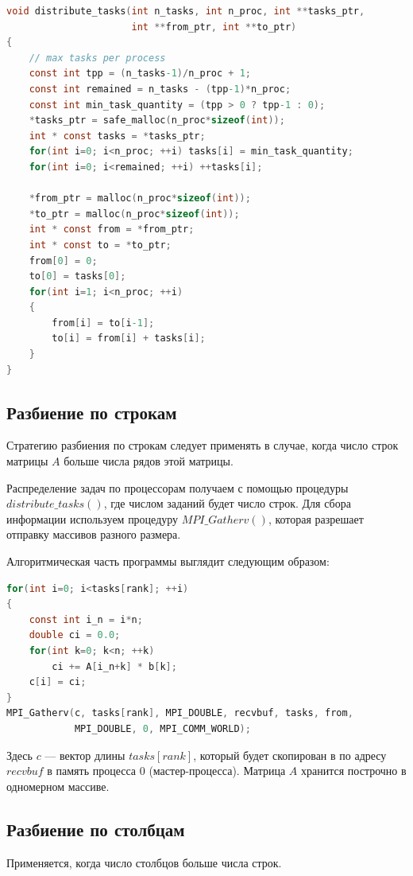 \documentclass[14pt]{extarticle}
\begin{document}
\begin{lstlisting}[language=C]
void distribute_tasks(int n_tasks, int n_proc, int **tasks_ptr,
                      int **from_ptr, int **to_ptr)
{
    // max tasks per process
    const int tpp = (n_tasks-1)/n_proc + 1;
    const int remained = n_tasks - (tpp-1)*n_proc;
    const int min_task_quantity = (tpp > 0 ? tpp-1 : 0);
    *tasks_ptr = safe_malloc(n_proc*sizeof(int));
    int * const tasks = *tasks_ptr;
    for(int i=0; i<n_proc; ++i) tasks[i] = min_task_quantity;
    for(int i=0; i<remained; ++i) ++tasks[i];

    *from_ptr = malloc(n_proc*sizeof(int));
    *to_ptr = malloc(n_proc*sizeof(int));
    int * const from = *from_ptr;
    int * const to = *to_ptr;
    from[0] = 0;
    to[0] = tasks[0];
    for(int i=1; i<n_proc; ++i)
    {
        from[i] = to[i-1];
        to[i] = from[i] + tasks[i];
    }
}
\end{lstlisting}

\subsection{Разбиение по строкам}
Стратегию разбиения по строкам следует применять в случае, когда число строк матрицы $A$ больше числа рядов этой матрицы.

Распределение задач по процессорам получаем с помощью процедуры \\ $distribute\_tasks()$, где числом заданий будет число строк. Для сбора информации используем процедуру $MPI\_Gatherv()$, которая разрешает отправку массивов разного размера.

Алгоритмическая часть программы выглядит следующим образом:

\begin{lstlisting}[language=C]
for(int i=0; i<tasks[rank]; ++i)
{
    const int i_n = i*n;
    double ci = 0.0;
    for(int k=0; k<n; ++k)
        ci += A[i_n+k] * b[k];
    c[i] = ci;
}
MPI_Gatherv(c, tasks[rank], MPI_DOUBLE, recvbuf, tasks, from,
			MPI_DOUBLE, 0, MPI_COMM_WORLD);
\end{lstlisting}

Здесь $c$ --- вектор длины $tasks[rank]$, который будет скопирован в по адресу $recvbuf$ в память процесса 0 (мастер-процесса). Матрица $A$ хранится построчно в одномерном массиве.

\subsection{Разбиение по столбцам}
Применяется, когда число столбцов больше числа строк.
\end{document}

